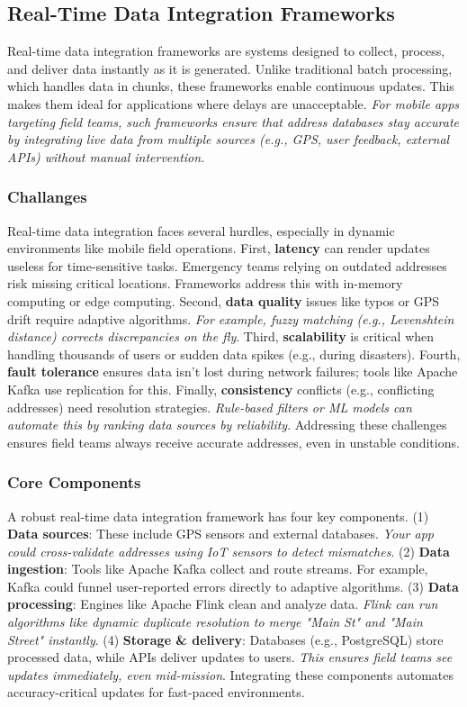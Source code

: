     \subsection{Real-Time Data Integration Frameworks}
    Real-time data integration frameworks are systems designed to collect, process, and deliver data instantly as it is generated. Unlike traditional batch processing, which handles data in chunks, these frameworks enable continuous updates. This makes them ideal for applications where delays are unacceptable. \textit{For mobile apps targeting field teams, such frameworks ensure that address databases stay accurate by integrating live data from multiple sources (e.g., GPS, user feedback, external APIs) without manual intervention.}

        \subsubsection{Challanges}
        Real-time data integration faces several hurdles, especially in dynamic environments like mobile field operations. First, \textbf{latency} can render updates useless for time-sensitive tasks. Emergency teams relying on outdated addresses risk missing critical locations. Frameworks address this with in-memory computing or edge computing. Second, \textbf{data quality} issues like typos or GPS drift require adaptive algorithms. \textit{For example, fuzzy matching (e.g., Levenshtein distance) corrects discrepancies on the fly}. Third, \textbf{scalability} is critical when handling thousands of users or sudden data spikes (e.g., during disasters). Fourth, \textbf{fault tolerance} ensures data isn't lost during network failures; tools like Apache Kafka use replication for this. Finally, \textbf{consistency} conflicts (e.g., conflicting addresses) need resolution strategies. \textit{Rule-based filters or ML models can automate this by ranking data sources by reliability}. Addressing these challenges ensures field teams always receive accurate addresses, even in unstable conditions.

        \subsubsection{Core Components}

        A robust real-time data integration framework has four key components. (1) \textbf{Data sources}: These include GPS sensors and external databases. \textit{Your app could cross-validate addresses using IoT sensors to detect mismatches}. (2) \textbf{Data ingestion}: Tools like Apache Kafka collect and route streams. For example, Kafka could funnel user-reported errors directly to adaptive algorithms. (3) \textbf{Data processing}: Engines like Apache Flink clean and analyze data. \textit{Flink can run algorithms like dynamic duplicate resolution to merge "Main St" and "Main Street" instantly}. (4) \textbf{Storage \& delivery}: Databases (e.g., PostgreSQL) store processed data, while APIs deliver updates to users. \textit{This ensures field teams see updates immediately, even mid-mission}. Integrating these components automates accuracy-critical updates for fast-paced environments.

